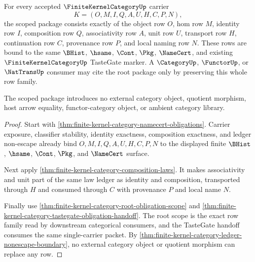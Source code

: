 \begin{theorem}
\label{thm:finite-kernel-category-scoped-closure-package}
For every accepted $\FiniteKernelCategoryUp$ carrier
$$
K=(O,M,I,Q,A,U,H,C,P,N),
$$
the scoped package consists exactly of the object row $O$, hom row $M$, identity row $I$, composition row $Q$, associativity row $A$, unit row $U$, transport row $H$, continuation row $C$, provenance row $P$, and local naming row $N$. These rows are bound to the same $\BHist$, $\hsame$, $\Cont$, $\Pkg$, $\NameCert$, and existing $\FiniteKernelCategoryUp$ TasteGate marker. A $\CategoryUp$, $\FunctorUp$, or $\NatTransUp$ consumer may cite the root package only by preserving this whole row family.

The scoped package introduces no external category object, quotient morphism, host arrow equality, functor-category object, or ambient category library.
\end{theorem}
\begin{proof}
Start with \autoref{thm:finite-kernel-category-namecert-obligations}. Carrier exposure, classifier stability, identity exactness, composition exactness, and ledger non-escape already bind $O,M,I,Q,A,U,H,C,P,N$ to the displayed finite $\BHist$, $\hsame$, $\Cont$, $\Pkg$, and $\NameCert$ surface.

Next apply \autoref{thm:finite-kernel-category-composition-laws}. It makes associativity and unit part of the same law ledger as identity and composition, transported through $H$ and consumed through $C$ with provenance $P$ and local name $N$.

Finally use \autoref{thm:finite-kernel-category-root-obligation-scope} and \autoref{thm:finite-kernel-category-tastegate-obligation-handoff}. The root scope is the exact row family read by downstream categorical consumers, and the TasteGate handoff consumes the same single-carrier packet. By \autoref{thm:finite-kernel-category-ledger-nonescape-boundary}, no external category object or quotient morphism can replace any row.
\end{proof}


